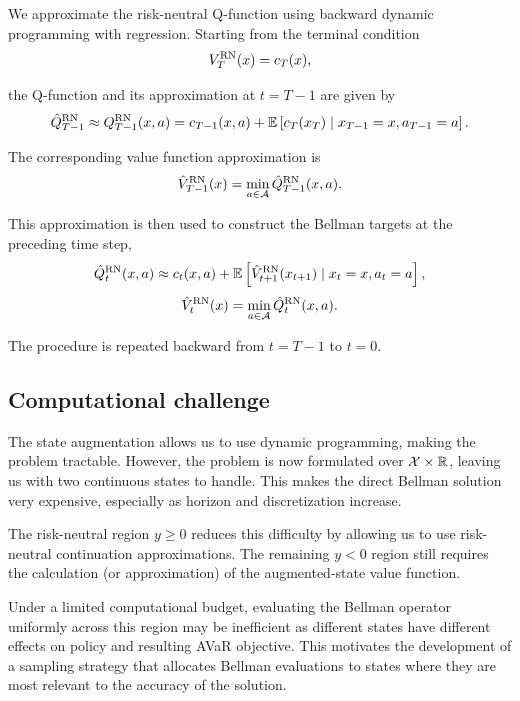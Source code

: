 We approximate the risk-neutral Q-function using backward dynamic programming with regression. Starting from the terminal condition
\begin{equation}
	V_T^{\text{RN}}(x)=c_T(x),
	\notag
	\label{value-rn-terminal}
\end{equation}

the Q-function and its approximation at $t=T-1$ are given by
\begin{equation}
	\hat{Q}_{T-1}^{\text{RN}} \approx Q_{T-1}^{\text{RN}}(x,a) = c_{T-1}(x,a) + \mathbb{E} \left[c_T(x_T) \mid x_{T-1} = x,a_{T-1} = a\right].
	\notag
	\label{q-rn-preterminal}
\end{equation}

The corresponding value function approximation is
\begin{equation}
	\hat V_{T-1}^{\text{RN}}(x) = \min_{a \in \mathcal{A}}\hat Q_{T-1}^{\text{RN}}(x,a).
	\notag
	\label{value-rn-preterminal}
\end{equation}

This approximation is then used to construct the Bellman targets at the preceding time step,
\begin{equation}
	\hat Q_t^{\text{RN}}(x,a) \approx c_t(x,a) + \mathbb{E} \left[ \hat V_{t+1}^{\text{RN}}(x_{t+1}) \mid x_t=x,a_t=a \right],
	\label{q-rn-approx-bellman}
\end{equation}
\begin{equation}
	\hat{V}_t^{\text{RN}}(x) = \min_{a \in \mathcal{A}} \hat{Q}_t^{\text{RN}}(x, a).
	\notag
	\label{value-approx-bellman}
\end{equation}

The procedure is repeated backward from $t=T-1$ to $t=0$.

\subsection{Computational challenge}
\label{problem:challenge}

The state augmentation allows us to use dynamic programming, making the problem tractable. However, the problem is now formulated over $\mathcal{X} \times \mathbb{R}$, leaving us with two continuous states to handle. This makes the direct Bellman solution very expensive, especially as horizon and discretization increase.

The risk-neutral region $y \geq 0$ reduces this difficulty by allowing us to use risk-neutral continuation approximations. The remaining $y < 0$ region still requires the calculation (or approximation) of the augmented-state value function.

Under a limited computational budget, evaluating the Bellman operator uniformly across this region may be inefficient as different states have different effects on policy and resulting AVaR objective. This motivates the development of a sampling strategy that allocates Bellman evaluations to states where they are most relevant to the accuracy of the solution.